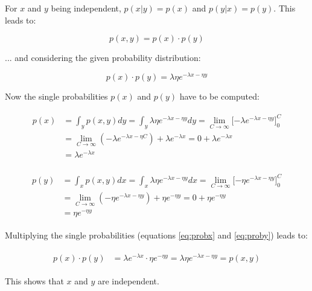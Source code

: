 \documentclass{article}
\begin{document}
For $x$ and $y$ being independent, $p(x|y) = p(x)$ and $p(y|x) = p(y)$. This leads to:

\begin{equation}
p(x, y) = p(x) \cdot p(y)
\end{equation}

... and considering the given probability distribution:

\begin{equation}
p(x) \cdot p(y) = \lambda\eta e ^ {- \lambda x - \eta y}
\end{equation}

Now the single probabilities $p(x)$ and $p(y)$ have to be computed:

\begin{align}
\begin{aligned}\label{eq:probx}
p(x) 	& = \int_y p(x, y) dy = \int_y \lambda\eta e ^ {- \lambda x - \eta y} dy = \lim\limits_{C\rightarrow \infty}\lbrack-\lambda e ^{-\lambda x - \eta y}\rbrack^{C}_0 \\
	& = \lim\limits_{C\rightarrow \infty}(-\lambda e ^{-\lambda x - \eta C}) + \lambda e ^{-\lambda x } = 0 + \lambda e ^{-\lambda x } \\
	& = \lambda e ^{-\lambda x }
\end{aligned}
\end{align}

\begin{align}
\begin{aligned}\label{eq:proby}
p(y) 	& = \int_x p(x, y) dx = \int_x \lambda\eta e ^ {- \lambda x - \eta y} dx = \lim\limits_{C\rightarrow \infty}\lbrack-\eta e ^{-\lambda x - \eta y}\rbrack^{C}_0 \\
	& = \lim\limits_{C\rightarrow \infty}(-\eta e ^{-\lambda x - \eta y}) + \eta e ^{- \eta y} = 0 + \eta e ^{- \eta y}\\
	& = \eta e ^{- \eta y}
\end{aligned}
\end{align}

Multiplying the single probabilities (equations \ref{eq:probx} and \ref{eq:proby}) leads to:

\begin{align}
\begin{aligned}
p(x) \cdot p(y) & = \lambda e ^{-\lambda x }  \cdot \eta e ^{- \eta y} = \lambda \eta e ^{-\lambda x - \eta y} = p(x,y)
\end{aligned}
\end{align}

This shows that $x$ and $y$ are independent.
\end{document}
